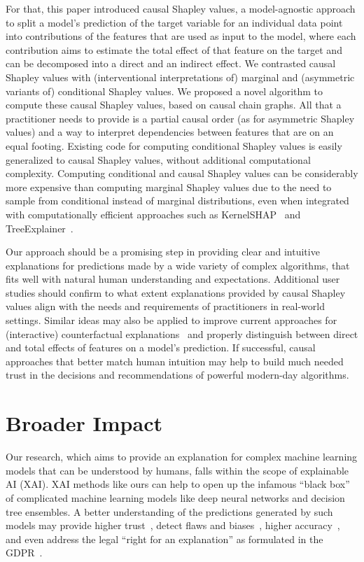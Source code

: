 \documentclass{article}
\begin{document}
For that, this paper introduced causal Shapley values, a model-agnostic approach to split a model's prediction of the target variable for an individual data point into contributions of the features that are used as input to the model, where each contribution aims to estimate the total effect of that feature on the target and can be decomposed into a direct and an indirect effect. We contrasted causal Shapley values with (interventional interpretations of) marginal and (asymmetric variants of) conditional Shapley values. We proposed a novel algorithm to compute these causal Shapley values, based on causal chain graphs. All that a practitioner needs to provide is a partial causal order (as for asymmetric Shapley values) and a way to interpret dependencies between features that are on an equal footing. Existing code for computing conditional Shapley values is easily generalized to causal Shapley values, without additional computational complexity. Computing conditional and causal Shapley values can be considerably more expensive than computing marginal Shapley values due to the need to sample from conditional instead of marginal distributions, even when integrated with computationally efficient approaches such as KernelSHAP~\cite{lundberg2017unified} and TreeExplainer~\cite{lundberg2020local}.

Our approach should be a promising step in providing clear and intuitive explanations for predictions made by a wide variety of complex algorithms, that fits well with natural human understanding and expectations. Additional user studies should confirm to what extent explanations provided by causal Shapley values align with the needs and requirements of practitioners in real-world settings. Similar ideas may also be applied to improve current approaches for (interactive) counterfactual explanations~\cite{wachter2017counterfactual} and properly distinguish between direct and total effects of features on a model's prediction. If successful, causal approaches that better match human intuition may help to build much needed trust in the decisions and recommendations of powerful modern-day algorithms. 


\section*{Broader Impact}




Our research, which aims to provide an explanation for complex machine learning models that can be understood by humans, falls within the scope of explainable AI (XAI). XAI methods like ours can help to open up the infamous ``black box'' of complicated machine learning models like deep neural networks and decision tree ensembles. A better understanding of the predictions generated by such models may provide higher trust~\cite{ribeiro2016should}, detect flaws and biases~\cite{kusner2017counterfactual}, higher accuracy~\cite{bhatt2020explainable}, and even address the legal ``right for an explanation'' as formulated in the GDPR~\cite{gdpr2017}.
\end{document}
